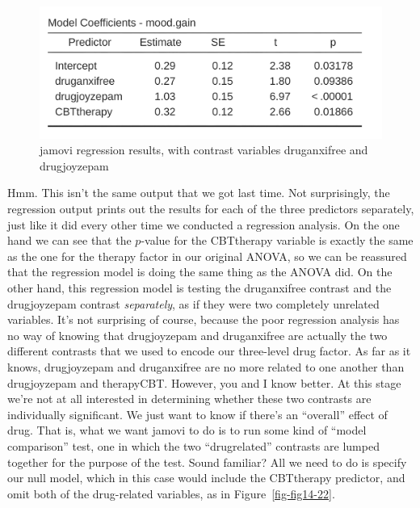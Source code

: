 \documentclass[
  a4paper,
]{book}
\begin{document}
\begin{figure}

\includegraphics[width=1\textwidth,height=\textheight]{images/fig14-21.png} \hfill{}

\caption{\label{fig-fig14-21}jamovi regression results, with contrast
variables druganxifree and drugjoyzepam}

\end{figure}

Hmm. This isn't the same output that we got last time. Not surprisingly,
the regression output prints out the results for each of the three
predictors separately, just like it did every other time we conducted a
regression analysis. On the one hand we can see that the \(p\)-value for
the CBTtherapy variable is exactly the same as the one for the therapy
factor in our original ANOVA, so we can be reassured that the regression
model is doing the same thing as the ANOVA did. On the other hand, this
regression model is testing the druganxifree contrast and the
drugjoyzepam contrast \emph{separately}, as if they were two completely
unrelated variables. It's not surprising of course, because the poor
regression analysis has no way of knowing that drugjoyzepam and
druganxifree are actually the two different contrasts that we used to
encode our three-level drug factor. As far as it knows, drugjoyzepam and
druganxifree are no more related to one another than drugjoyzepam and
therapyCBT. However, you and I know better. At this stage we're not at
all interested in determining whether these two contrasts are
individually significant. We just want to know if there's an ``overall''
effect of drug. That is, what we want jamovi to do is to run some kind
of ``model comparison'' test, one in which the two ``drugrelated''
contrasts are lumped together for the purpose of the test. Sound
familiar? All we need to do is specify our null model, which in this
case would include the CBTtherapy predictor, and omit both of the
drug-related variables, as in Figure~\ref{fig-fig14-22}.
\end{document}
